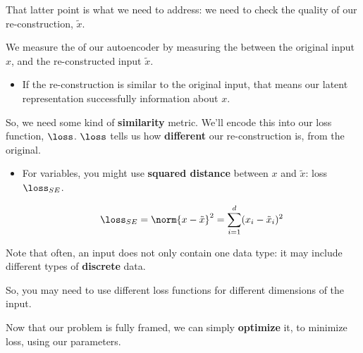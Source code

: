     That latter point is what we need to address: we need to check the quality of our re-construction, $\tilde{x}$.\\

    \begin{concept}
        We measure the  of our autoencoder by measuring the  between the original input $x$, and the re-constructed input $\tilde{x}$.

        \begin{itemize}
            \item If the re-construction is similar to the original input, that means our latent representation successfully  information about $x$.
        \end{itemize}
    \end{concept}

    So, we need some kind of \textbf{similarity} metric. We'll encode this into our loss function, $\loss$. $\loss$ tells us how \textbf{different} our re-construction is, from the original.

    \begin{itemize}
        \item For  variables, you might use \textbf{squared distance} between $x$ and $\tilde{x}$: loss $\loss_{SE}$.

        \begin{equation}
            \loss_{SE} = \norm{x-\tilde{x}}^2 = \sum_{i=1}^d (x_i-\tilde{x}_i)^2
        \end{equation}
    \end{itemize}

    Note that often, an input does not only contain one data type: it may include different types of \textbf{discrete} data. 

    So, you may need to use different loss functions for different dimensions of the input.

    \subsecdiv

    Now that our problem is fully framed, we can simply \textbf{optimize} it, to minimize loss, using our parameters.\\

